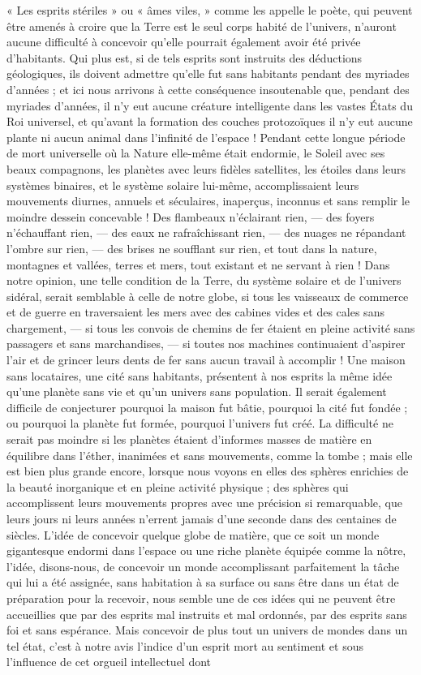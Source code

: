 \documentclass[a4paper, 11pt, oneside]{article}
\begin{document}
« Les esprits stériles » ou « âmes viles, » comme les appelle le poète, qui peuvent être amenés à croire que la Terre est le seul corps habité de l'univers, n'auront aucune difficulté à concevoir qu'elle pourrait également avoir été privée d'habitants. Qui plus est, si de tels esprits sont instruits des déductions géologiques, ils doivent admettre qu'elle fut sans habitants pendant des myriades d'années ; et ici nous arrivons à cette conséquence insoutenable que, pendant des myriades d'années, il n'y eut aucune créature intelligente dans les vastes États du Roi universel, et qu'avant la formation des couches protozoïques il n'y eut aucune plante ni aucun animal dans l'infinité de l'espace ! Pendant cette longue période de mort universelle où la Nature elle-même était endormie, le Soleil avec ses beaux compagnons, les planètes avec leurs fidèles satellites, les étoiles dans leurs systèmes binaires, et le système solaire lui-même, accomplissaient leurs mouvements diurnes, annuels et séculaires, inaperçus, inconnus et sans remplir le moindre dessein concevable ! Des flambeaux n'éclairant rien, --- des foyers n'échauffant rien, --- des eaux ne rafraîchissant rien, --- des nuages ne répandant l'ombre sur rien, --- des brises ne soufflant sur rien, et tout dans la nature, montagnes et vallées, terres et mers, tout existant et ne servant à rien ! Dans notre opinion, une telle condition de la Terre, du système solaire et de l'univers sidéral, serait semblable à celle de notre globe, si tous les vaisseaux de commerce et de guerre en traversaient les mers avec des cabines vides et des cales sans chargement, --- si tous les convois de chemins de fer étaient en pleine activité sans passagers et sans marchandises, --- si toutes nos machines continuaient d'aspirer l'air et de grincer leurs dents de fer sans aucun travail à accomplir ! Une maison sans locataires, une cité sans habitants, présentent à nos esprits la même idée qu'une planète sans vie et qu'un univers sans population. Il serait également difficile de conjecturer pourquoi la maison fut bâtie, pourquoi la cité fut fondée ; ou pourquoi la planète fut formée, pourquoi l'univers fut créé. La difficulté ne serait pas moindre si les planètes étaient d'informes masses de matière en équilibre dans l'éther, inanimées et sans mouvements, comme la tombe ; mais elle est bien plus grande encore, lorsque nous voyons en elles des sphères enrichies de la beauté inorganique et en pleine activité physique ; des sphères qui accomplissent leurs mouvements propres avec une précision si remarquable, que leurs jours ni leurs années n'errent jamais d'une seconde dans des centaines de siècles. L'idée de concevoir quelque globe de matière, que ce soit un monde gigantesque endormi dans l'espace ou une riche planète équipée comme la nôtre, l'idée, disons-nous, de concevoir un monde accomplissant parfaitement la tâche qui lui a été assignée, sans habitation à sa surface ou sans être dans un état de préparation pour la recevoir, nous semble une de ces idées qui ne peuvent être accueillies que par des esprits mal instruits et mal ordonnés, par des esprits sans foi et sans espérance. Mais concevoir de plus tout un univers de mondes dans un tel état, c'est à notre avis l'indice d'un esprit mort au sentiment et sous l'influence de cet orgueil intellectuel dont 
\end{document}
